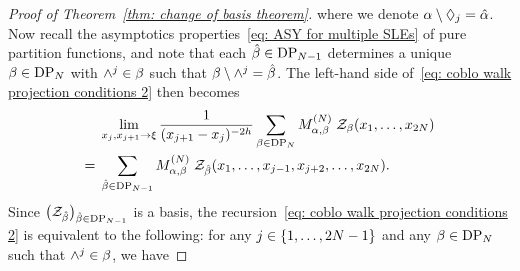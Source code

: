 \documentclass[oneside,english]{amsart}
\numberwithin{equation}{section}
\numberwithin{figure}{section}
\theoremstyle{plain}
\theoremstyle{plain}
\theoremstyle{plain}
\theoremstyle{remark}
\theoremstyle{plain}
\theoremstyle{plain}
\theoremstyle{plain}
\theoremstyle{plain}
\theoremstyle{plain}
\theoremstyle{plain}
\theoremstyle{plain}
\theoremstyle{plain}
\newcommand{\blue}[1]{{\color{blue} #1}}
\begin{document}
\begin{proof}[Proof of Theorem~\ref{thm: change of basis theorem}]
where we denote $\alpha \setminus \lozenge_j = \hat{\alpha}$.
Now recall the asymptotics properties~\eqref{eq: ASY for multiple SLEs} of pure partition functions,
and note that each $\hat{\beta} \in \mathrm{DP}_{N-1}$ determines a unique 
$\beta \in \mathrm{DP}_N$ with $\wedge^j \in \beta$ such that $\beta \setminus \wedge^j = \hat{\beta}$.
The left-hand side of~\eqref{eq: coblo walk projection conditions 2} then becomes
\begin{align*}
& \lim_{x_j , x_{j+1} \to \xi} \frac{1}{(x_{j+1} - x_j)^{-2h}}
    \sum_{\beta \in \mathrm{DP}_N} M^{(N)}_{\alpha, \beta} \; \mathcal{Z}_\beta (x_1 , \ldots, x_{2N}) \\
= \; & \sum_{\hat{\beta} \in \mathrm{DP}_{N-1}} M^{(N)}_{\alpha, \beta} \; \mathcal{Z}_{ \hat{\beta} } (x_1 , \ldots, x_{j-1} , x_{j+2}, \ldots, x_{2N}) .
\end{align*}
Since $\big( \mathcal{Z}_{ \hat{\beta} } \big)_{\hat{\beta}  \in \mathrm{DP}_{N - 1}}$ is a basis,
the recursion~\eqref{eq: coblo walk projection conditions 2} is equivalent to
the following: %
for any $j \in \left\{ 1,\ldots,2N-1\right\}$ and any $\beta \in \mathrm{DP}_N$ such that $\wedge^j \in \beta$, we have

\end{proof}
\end{document}
